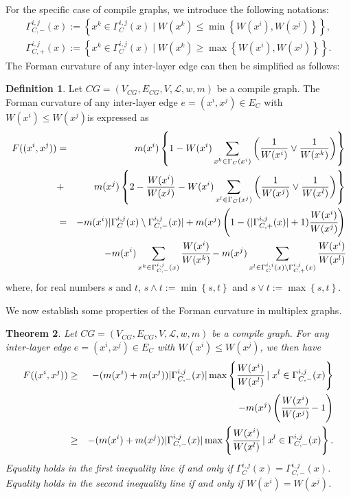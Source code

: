 \documentclass[preprint,12pt,number]{elsarticle}
\theoremstyle{plain} %
\newtheorem{theorem}{\indent\sc Theorem}[section] %
\theoremstyle{definition} %
\newtheorem{definition}[theorem]{\indent\sc Definition}
\begin{document}
For the specific case of compile graphs, we introduce the following notations:
\begin{eqnarray*}
    \Gamma^{i,j}_{C,-}(x) := \left\{x^k \in \Gamma^{i,j}_C (x)\mid W(x^k) \leq \min \left\{W(x^i), W(x^j) \right\} \right\},\\
    \Gamma^{i,j}_{C,+}(x) := \left\{x^k \in \Gamma^{i,j}_C (x)\mid W(x^k) \geq \max \left\{W(x^i), W(x^j) \right\} \right\}.
\end{eqnarray*}
The Forman curvature of any inter-layer edge can then be simplified as follows:
\begin{definition}
    Let $CG = (V_{CG}, E_{CG}, V, \mathcal{L}, w, m)$ be a compile graph. The Forman curvature of any inter-layer edge $e =(x^i, x^j) \in E_C$ with $W(x^i) \leq W(x^j)$is expressed as
    \begin{eqnarray*}
        F((x^i,x^j)) &=& m(x^i)\left\{1 - W(x^i)\sum_{x^k \in \Gamma_C(x^i)} \left(\frac{1}{W(x^i)} \vee \frac{1}{W(x^k)}\right) \right\}\\
        &+ & m(x^j)\left\{2 - \frac{W(x^i)}{W(x^j)} - W(x^i)\sum_{x^l \in \Gamma_C(x^j)} \left(\frac{1}{W(x^j)} \vee \frac{1}{W(x^l)}\right) \right\} \\
        &=&-m(x^i)|\Gamma_C^{i,j}(x) \setminus \Gamma_{C,-}^{i,j}(x)| + m(x^j)\left(1 - (|\Gamma_{C,+}^{i,j}(x)|+1)\cfrac{W(x^i)}{W(x^j)}\right) \nonumber\\
        &\ & -m(x^i) \sum_{x^k \in \Gamma_{C,-}^{i,j}(x)} \cfrac{W(x^i)}{W(x^k)} - m(x^j)\sum_{x^l \in \Gamma^{i,j}_C(x) \setminus \Gamma_{C,+}^{i,j}(x)}\cfrac{W(x^i)}{W(x^l)}
    \end{eqnarray*}
    where, for real numbers $s$ and $t$, $s \wedge t := \min \left\{s,t\right\}$ and $s \vee t := \max \left\{s,t\right\}$.
\end{definition}

We now establish some properties of the Forman curvature in multiplex graphs.
\begin{theorem}
\label{lower}
    Let $CG = (V_{CG}, E_{CG}, V, \mathcal{L}, w, m)$ be a compile graph. 
    For any inter-layer edge $e =(x^i, x^j) \in E_C$ with $W(x^i) \leq W(x^j)$, we then have
    \begin{eqnarray}
    \label{Formanvalue}
        F((x^i,x^j)) 
        &\geq& -(m(x^i)+m(x^j)) |\Gamma^{i,j}_{C,-} (x)|\max \left\{ \cfrac{W(x^i)}{W(x^l)} \mid x^l \in \Gamma^{i,j}_{C,-}(x)\right\} \nonumber\\
        &\ & - m(x^j)\left(\cfrac{W(x^i)}{W(x^j)} -1 \right)\\
        &\geq& -(m(x^i)+m(x^j)) |\Gamma^{i,j}_{C,-} (x)|\max \left\{ \cfrac{W(x^i)}{W(x^l)} \mid x^l \in \Gamma^{i,j}_{C,-} (x)\right\}.
    \end{eqnarray}
    Equality holds in the first inequality line if and only if $\Gamma^{i,j}_C (x)= \Gamma^{i,j}_{C,-}(x)$. Equality holds in the second inequality line if and only if $W(x^i) = W(x^j)$.
\end{theorem}
\end{document}

